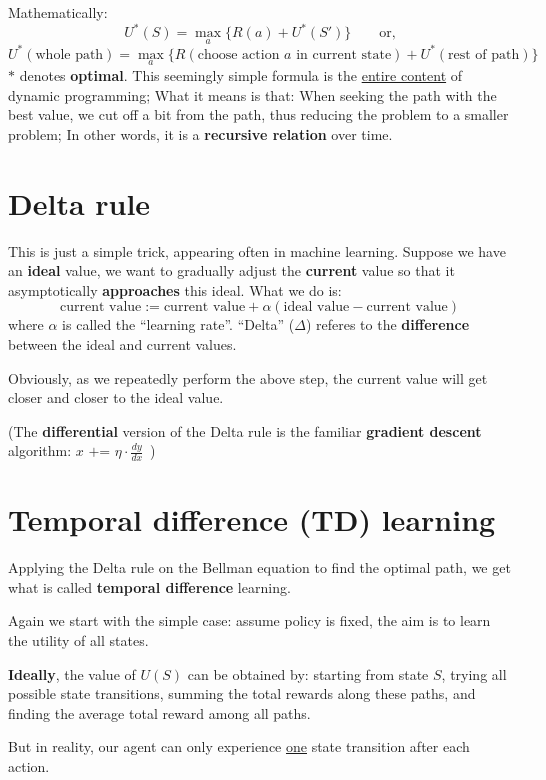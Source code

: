 \documentclass[orivec]{llncs}
\newcommand{\emp}[1]{\textbf{#1}}
\begin{document}
Mathematically:
$$ U^*(S) = \max_a \{ R(a) + U^*(S') \} \quad \quad \mbox{or,} $$
$$ U^*(\mbox{whole path}) = \max_a \{ R(\mbox{choose action $a$ in current state}) + U^*(\mbox{rest of path}) \} $$
$*$ denotes \emp{optimal}. This seemingly simple formula is the \uline{entire content} of dynamic programming;  What it means is that:  When seeking the path with the best value, we cut off a bit from the path, thus reducing the problem to a smaller problem;  In other words, it is a \textbf{recursive relation} over time.

\section{Delta rule}

This is just a simple trick, appearing often in machine learning.  Suppose we have an \textbf{ideal} value, we want to gradually adjust the \textbf{current} value so that it asymptotically \textbf{approaches} this ideal.  What we do is:
$$ \mbox{current value} := \mbox{current value} + \alpha ( \mbox{ideal value} - \mbox{current value}) $$
where $\alpha$ is called the ``learning rate''.  ``Delta'' ($\Delta$) referes to the \textbf{difference} between the ideal and current values.

Obviously, as we repeatedly perform the above step, the current value will get closer and closer to the ideal value.

(The \textbf{differential} version of the Delta rule is the familiar \textbf{gradient descent} algorithm:  $x \mbox{ += } \eta \cdot \frac{dy}{dx} \,$ )

\section{Temporal difference (TD) learning}

Applying the Delta rule on the Bellman equation to find the optimal path, we get what is called \textbf{temporal difference} learning.

Again we start with the simple case:  assume policy is fixed, the aim is to learn the utility of all states.

\textbf{Ideally}, the value of $U(S)$ can be obtained by:  starting from state $S$, trying all possible state transitions, summing the total rewards along these paths, and finding the average total reward among all paths.

But in reality, our agent can only experience \uline{one} state transition after each action.
\end{document}
